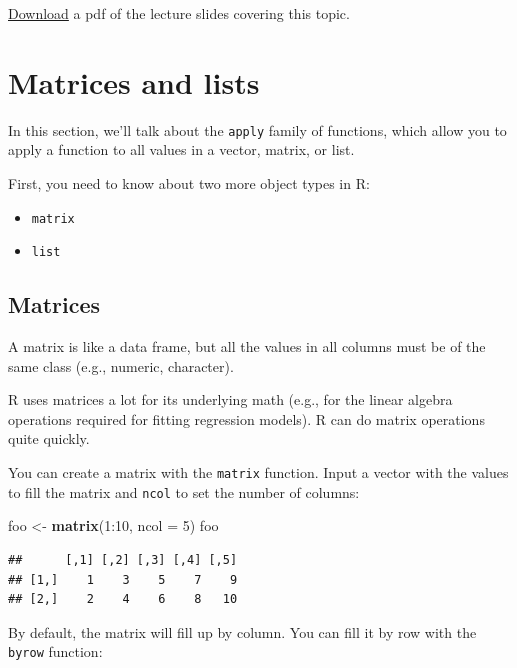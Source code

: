 \documentclass[]{book}
\makeatletter
\newenvironment{Shaded}{\begin{snugshade}}{\end{snugshade}}
\newcommand{\KeywordTok}[1]{\textcolor[rgb]{0.13,0.29,0.53}{\textbf{{#1}}}}
\newcommand{\DataTypeTok}[1]{\textcolor[rgb]{0.13,0.29,0.53}{{#1}}}
\newcommand{\DecValTok}[1]{\textcolor[rgb]{0.00,0.00,0.81}{{#1}}}
\newcommand{\StringTok}[1]{\textcolor[rgb]{0.31,0.60,0.02}{{#1}}}
\newcommand{\NormalTok}[1]{{#1}}
\providecommand{\tightlist}{%
  \setlength{\itemsep}{0pt}\setlength{\parskip}{0pt}}
\newenvironment{kframe}{%
\medskip{}
\setlength{\fboxsep}{.8em}
 \def\at@end@of@kframe{}%
 \ifinner\ifhmode%
  \def\at@end@of@kframe{\end{minipage}}%
  \begin{minipage}{\columnwidth}%
 \fi\fi%
 \def\FrameCommand##1{\hskip\@totalleftmargin \hskip-\fboxsep
 \colorbox{shadecolor}{##1}\hskip-\fboxsep
     \hskip-\linewidth \hskip-\@totalleftmargin \hskip\columnwidth}%
 \MakeFramed {\advance\hsize-\width
   \@totalleftmargin\z@ \linewidth\hsize
   \@setminipage}}%
 {\par\unskip\endMakeFramed%
 \at@end@of@kframe}
\renewenvironment{Shaded}{\begin{kframe}}{\end{kframe}}
\makeatother
\begin{document}
\href{https://github.com/geanders/RProgrammingForResearch/raw/master/slides/CourseNotes_Week8.pdf}{Download}
a pdf of the lecture slides covering this topic.

\section{Matrices and lists}\label{matrices-and-lists}

In this section, we'll talk about the \texttt{apply} family of
functions, which allow you to apply a function to all values in a
vector, matrix, or list. \bigskip

First, you need to know about two more object types in R:

\begin{itemize}
\tightlist
\item
  \texttt{matrix}
\item
  \texttt{list}
\end{itemize}

\subsection{Matrices}\label{matrices}

A matrix is like a data frame, but all the values in all columns must be
of the same class (e.g., numeric, character).

R uses matrices a lot for its underlying math (e.g., for the linear
algebra operations required for fitting regression models). R can do
matrix operations quite quickly.

You can create a matrix with the \texttt{matrix} function. Input a
vector with the values to fill the matrix and \texttt{ncol} to set the
number of columns:

\begin{Shaded}
\begin{Highlighting}[]
\NormalTok{foo <-}\StringTok{ }\KeywordTok{matrix}\NormalTok{(}\DecValTok{1}\NormalTok{:}\DecValTok{10}\NormalTok{, }\DataTypeTok{ncol =} \DecValTok{5}\NormalTok{)}
\NormalTok{foo}
\end{Highlighting}
\end{Shaded}

\begin{verbatim}
##      [,1] [,2] [,3] [,4] [,5]
## [1,]    1    3    5    7    9
## [2,]    2    4    6    8   10
\end{verbatim}

By default, the matrix will fill up by column. You can fill it by row
with the \texttt{byrow} function:
\end{document}

